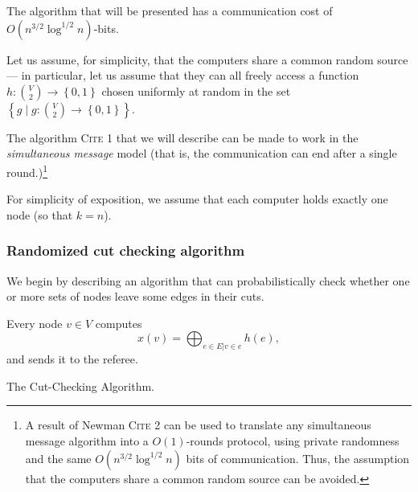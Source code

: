 The algorithm that will be presented has a communication cost of $O\left(n^{3/2} \log^{1/2} n\right)$-bits.

Let us assume, for simplicity, that the computers share a common random source --- in particular, let us assume that they can all freely access a  function $h: \binom{V}2 \rightarrow \left\{0,1\right\}$ chosen uniformly at random in the set $\left\{g \mid g: \binom{V}2 \rightarrow \left\{0,1\right\}\right\}$.

\smallskip


The algorithm \textsc{Cite 1} that we will describe can be made to work in the {\em simultaneous message} model (that is, the communication can end after a single round.)\footnote{A result of Newman \textsc{Cite 2} can be used to translate any simultaneous message algorithm into a $O(1)$-rounds protocol, using private randomness and the same $O\left(n^{3/2} \log^{1/2} n\right)$ bits of communication. Thus, the assumption that the computers share a common random source can be avoided.}

\smallskip

For simplicity of exposition, we assume that each computer holds exactly one node (so that $k = n$).

\subsubsection{Randomized cut checking algorithm}

We begin by describing an algorithm that can probabilistically check whether one or more sets of nodes leave some edges in their cuts.

\begin{algorithm}
Every node $v \in V$ computes $$x(v) = \bigoplus_{e \in E | v \in e} h(e),$$
and sends it to the referee.
\caption{\label{alg:cutcheck}The Cut-Checking Algorithm.}
\end{algorithm}

